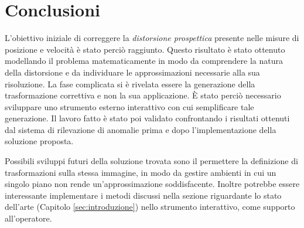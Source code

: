 \chapter{Conclusioni}
\label{sec:conclusioni}

L'obiettivo iniziale di correggere la \emph{distorsione prospettica} presente nelle misure di posizione e velocità è stato perciò raggiunto.
Questo risultato è stato ottenuto modellando il problema matematicamente in modo da comprendere la natura della distorsione e da individuare le approssimazioni necessarie alla sua risoluzione.
La fase complicata si è rivelata essere la generazione della trasformazione correttiva e non la sua applicazione.
È stato perciò necessario sviluppare uno strumento esterno interattivo con cui semplificare tale generazione.
Il lavoro fatto è stato poi validato confrontando i risultati ottenuti dal sistema di rilevazione di anomalie prima e dopo l'implementazione della soluzione proposta.

Possibili sviluppi futuri della soluzione trovata sono il permettere la definizione di trasformazioni sulla stessa immagine, in modo da gestire ambienti in cui un singolo piano non rende un'approssimazione soddisfacente.
Inoltre potrebbe essere interessante implementare i metodi discussi nella sezione riguardante lo stato dell'arte (Capitolo \ref{sec:introduzione}) nello strumento interattivo, come supporto all'operatore.


